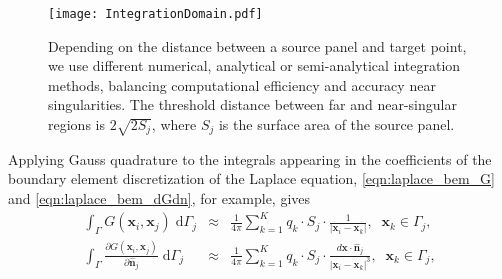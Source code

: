 \documentclass[smallcondensed,final]{svjour3}
\newcommand{\di}[1]{\text{d}#1}
\newcommand{\partiald}[2]{\frac{\partial #1}{\partial #2}}
\newcommand{\vect}[1]{\mathbf{#1}}
\newcommand{\nhat}{\hat{\mathbf{n}}}
\begin{document}
\begin{figure}
	\begin{centering}
	\texttt{[image: IntegrationDomain.pdf]}
	\caption{Depending on the distance between a source panel and target point, we use different numerical, analytical or semi-analytical integration methods, balancing computational efficiency and accuracy near singularities. The threshold distance between far and near-singular regions is $2\sqrt{2 S_j}$, where $S_j$ is the surface area of the source panel.}
	\label{fig:integration_domain}
	\end{centering}
\end{figure}



Applying Gauss quadrature to the integrals appearing in the coefficients of the boundary element discretization of the Laplace equation, \eqref{eqn:laplace_bem_G} and \eqref{eqn:laplace_bem_dGdn}, for example, gives
%
\begin{eqnarray}
	\label{eqn:gauss:1st-kind}
	\int_{\Gamma} G(\vect{x}_i,\vect{x}_j)\;\di{\Gamma_j} & \approx & \frac{1}{4\pi} \sum_{k=1}^{K} q_k\cdot S_j\cdot \frac{1}{|\vect{x}_i-\vect{x}_k|},\;\;\vect{x}_k \in \Gamma_j, \\ 
	\label{eqn:gauss:2nd-kind}
	\int_{\Gamma} \partiald{G(\vect{x}_i,\vect{x}_j)}{\nhat_j}\;\di{\Gamma_j} & \approx & \frac{1}{4\pi} \sum_{k=1}^{K}q_k\cdot S_j\cdot \frac{d\vect{x}\cdot\nhat_j}{|\vect{x}_i-\vect{x}_k|^{3}},\;\;\vect{x}_k \in \Gamma_j,
\end{eqnarray}
\end{document}
